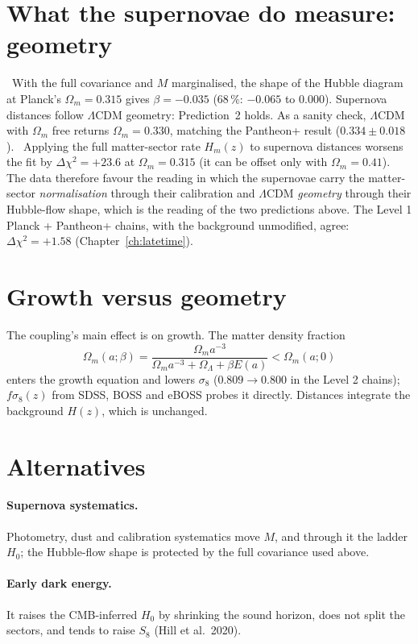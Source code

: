 \section{What the supernovae do measure: geometry}
\observed\ With the full covariance and $M$ marginalised, the shape of the Hubble diagram at Planck's $\Omega_m=0.315$ gives $\beta=-0.035$ ($68\,\%$: $-0.065$ to
$0.000$). Supernova distances follow $\Lambda$CDM geometry: Prediction~2 holds. As a sanity check, $\Lambda$CDM with $\Omega_m$ free returns $\Omega_m=0.330$,
matching the Pantheon+ result ($0.334\pm0.018$).
\calc\ Applying the full matter-sector rate $H_m(z)$ to supernova distances worsens the fit by $\Delta\chi^2=+23.6$ at $\Omega_m=0.315$ (it can be offset only with
$\Omega_m=0.41$). The data therefore favour the reading in which the supernovae carry the matter-sector \emph{normalisation} through their calibration and
$\Lambda$CDM \emph{geometry} through their Hubble-flow shape, which is the reading of the two predictions above. The Level 1 Planck + Pantheon+ chains,
with the background unmodified, agree: $\Delta\chi^2=+1.58$ (Chapter~\ref{ch:latetime}).

\section{Growth versus geometry}
The coupling's main effect is on growth. The matter density fraction
\begin{equation}
\Omega_m(a;\beta)=\frac{\Omega_ma^{-3}}{\Omega_ma^{-3}+\Omega_\Lambda+\beta E(a)}<\Omega_m(a;0)
\end{equation}
enters the growth equation and lowers $\sigma_8$ ($0.809\to0.800$ in the Level 2 chains); $f\sigma_8(z)$ from SDSS, BOSS and eBOSS probes it directly. Distances
integrate the background $H(z)$, which is unchanged.

\section{Alternatives}
\paragraph{Supernova systematics.} Photometry, dust and calibration systematics move $M$, and through it the ladder $H_0$; the Hubble-flow shape is protected by
the full covariance used above.
\paragraph{Early dark energy.} It raises the CMB-inferred $H_0$ by shrinking the sound horizon, does not split the sectors, and tends to raise $S_8$ (Hill et al.\ 2020).
